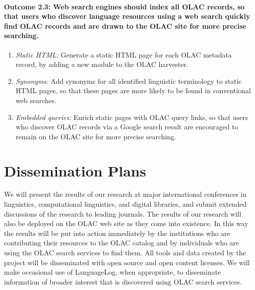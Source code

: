 
\def\task{2.3}
\paragraph{Outcome {\task}: Web search engines should index all OLAC records,
      so that users who discover language resources using a web search
      quickly find OLAC records and are drawn to the OLAC site for
      more precise searching.}

\begin{enumerate}[label=\emph{\task\alph*}]\setlength{\itemsep}{0pt}
\item \emph{Static HTML:}
  Generate a static HTML page for each OLAC metadata record, by adding
  a new module to the OLAC harvester.
\item \emph{Synonyms:}
  Add synonyms for all identified linguistic terminology to static HTML pages,
  so that these pages are more likely to be found in conventional web searches.
\item \emph{Embedded queries:}
  Enrich static pages with OLAC query links, so that users who discover
  OLAC records via a Google search result are encouraged to remain on the
  OLAC site for more precise searching.
\end{enumerate}

\section{Dissemination Plans}
\label{sec:dissemination}

We will present the results of our research at major international
conferences in linguistics, computational linguistics, and
digital libraries, and submit extended discussions of the research to
leading journals.  The results of our research will also be deployed
on the OLAC web site as they come into existence. In this way the
results will be put into action immediately by the institutions
who are contributing their resources to the OLAC catalog and by 
individuals who are using the OLAC search services to find them.
All tools and data created by the project will be
disseminated with open source and open content licenses.
We will make occasional use of LanguageLog, when appropriate, to
disseminate information of broader interest that is discovered using
OLAC search services.
